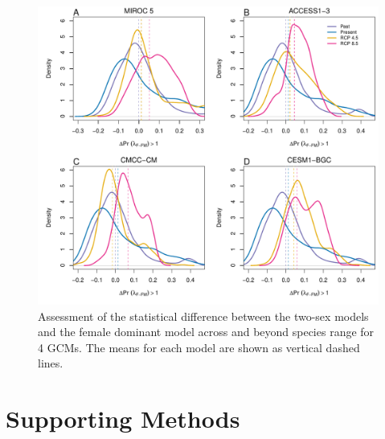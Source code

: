 \documentclass[12pt]{article}\usepackage[]{graphicx}\usepackage[dvipsnames]{xcolor}
\begin{document}
\begin{figure}[H]
	\begin{center}
		\includegraphics[width=0.99\linewidth]{Figures/Densityplot_lambda_GCMs.pdf}
		\caption{ Assessment of the statistical difference between the two-sex models and the female dominant model across and beyond species range for 4 GCMs. 
			The means for each model are shown as vertical dashed lines. }
		\label{Sup:geo_overestimation}
	\end{center}
\end{figure}




\section {Supporting Methods}
\end{document}
